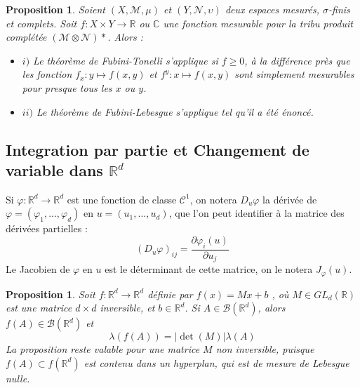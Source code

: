 \documentclass[3pt]{article}
\newtheorem{proposition}[theorem]{Proposition}
\begin{document}
\bigskip

\begin{proposition}
Soient $(X,\mathcal{M},\mu )$ et $(Y,\mathcal{N},\upsilon )$ deux espaces
mesur\'{e}s, $\sigma $-finis et complets. Soit $f:X\times Y\rightarrow 
\mathbb{R}$ ou $\mathbb{C}$ une fonction mesurable pour la tribu produit
compl\'{e}t\'{e}e $(\mathcal{M}\otimes \mathcal{N})\ast $. Alors :

\begin{itemize}
\item $i)$ Le th\'{e}or\`{e}me de Fubini-Tonelli s'applique si $f\geq 0$, 
\`{a} la diff\'{e}rence pr\`{e}s que les fonction $f_{x}:y\mapsto f(x,y)$ et 
$f^{y}:x\mapsto f(x,y)$ sont simplement mesurables pour presque tous les $x$
ou $y$.

\item $ii)$ Le th\'{e}or\`{e}me de Fubini-Lebesgue s'applique tel qu'il a 
\'{e}t\'{e} \'{e}nonc\'{e}.
\end{itemize}
\end{proposition}

\subsection{Integration par partie et Changement de variable dans $\mathbb{R}%
^{d}$}

\bigskip

Si $\varphi :\mathbb{R}^{d}\rightarrow \mathbb{R}^{d}$ est une fonction de
classe $\mathcal{C}^{1}$, on notera $D_{u}\varphi $ la d\'{e}riv\'{e}e de $%
\varphi =(\varphi _{1},...,\varphi _{d})$ en $u=(u_{1},...,u_{d})$, que l'on
peut identifier \`{a} la matrice des d\'{e}riv\'{e}es partielles :%
\begin{equation*}
\left( D_{u}\varphi \right) _{ij}=\frac{\partial \varphi _{i}(u)}{\partial
u_{j}}
\end{equation*}%
Le Jacobien de $\varphi $ en $u$ est le d\'{e}terminant de cette matrice, on
le notera $J_{\varphi }(u).$

\bigskip 

\begin{proposition}
Soit $f:\mathbb{R}^{d}\rightarrow \mathbb{R}^{d}$ d\'{e}finie par $f(x)=Mx+b$%
, o\`{u} $M\in GL_{d}(\mathbb{R})$ est une matrice $d\times d$ inversible,
et $b\in \mathbb{R}^{d}$. Si $A\in \mathcal{B}(\mathbb{R}^{d})$, alors $%
f(A)\in \mathcal{B}(\mathbb{R}^{d})$ et%
\begin{equation*}
\lambda (f(A))=\left\vert \det (M)\right\vert \lambda (A)
\end{equation*}%
La proposition reste valable pour une matrice $M$ non inversible, puisque $%
f(A)\subset f(\mathbb{R}^{d})$ est contenu dans un hyperplan, qui est de
mesure de Lebesgue nulle.
\end{proposition}
\end{document}
